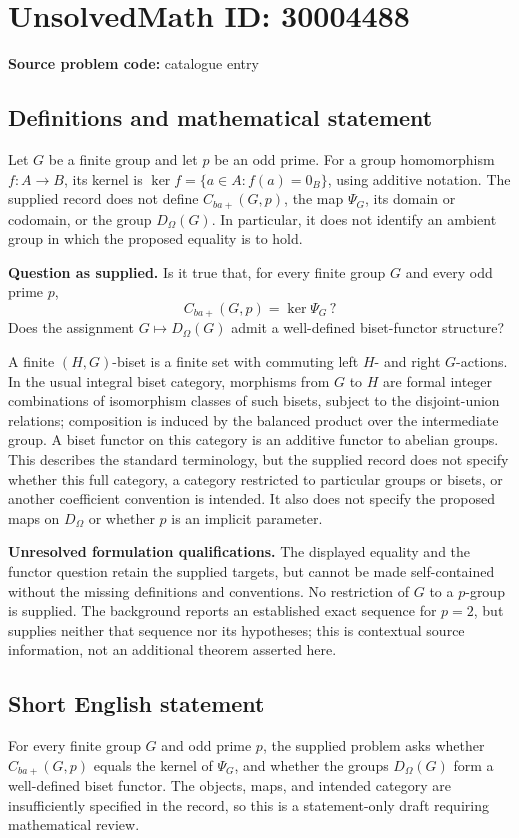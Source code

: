 \documentclass[11pt]{article}
\begin{document}
\section*{UnsolvedMath ID: 30004488}
\textbf{Source problem code:} catalogue entry
\subsection{Definitions and mathematical statement}
Let \(G\) be a finite group and let \(p\) be an odd prime. For a group homomorphism \(f\colon A\to B\), its kernel is \(\ker f=\{a\in A:f(a)=0_B\}\), using additive notation. The supplied record does not define \(C_{ba+}(G,p)\), the map \(\Psi_G\), its domain or codomain, or the group \(D_\Omega(G)\). In particular, it does not identify an ambient group in which the proposed equality is to hold.

\textbf{Question as supplied.} Is it true that, for every finite group \(G\) and every odd prime \(p\),
\[
C_{ba+}(G,p)=\ker\Psi_G\,?
\]
Does the assignment \(G\mapsto D_\Omega(G)\) admit a well-defined biset-functor structure?

A finite \((H,G)\)-biset is a finite set with commuting left \(H\)- and right \(G\)-actions. In the usual integral biset category, morphisms from \(G\) to \(H\) are formal integer combinations of isomorphism classes of such bisets, subject to the disjoint-union relations; composition is induced by the balanced product over the intermediate group. A biset functor on this category is an additive functor to abelian groups. This describes the standard terminology, but the supplied record does not specify whether this full category, a category restricted to particular groups or bisets, or another coefficient convention is intended. It also does not specify the proposed maps on \(D_\Omega\) or whether \(p\) is an implicit parameter.

\textbf{Unresolved formulation qualifications.} The displayed equality and the functor question retain the supplied targets, but cannot be made self-contained without the missing definitions and conventions. No restriction of \(G\) to a \(p\)-group is supplied. The background reports an established exact sequence for \(p=2\), but supplies neither that sequence nor its hypotheses; this is contextual source information, not an additional theorem asserted here.
\subsection{Short English statement}
For every finite group \(G\) and odd prime \(p\), the supplied problem asks whether \(C_{ba+}(G,p)\) equals the kernel of \(\Psi_G\), and whether the groups \(D_\Omega(G)\) form a well-defined biset functor. The objects, maps, and intended category are insufficiently specified in the record, so this is a statement-only draft requiring mathematical review.
\end{document}
